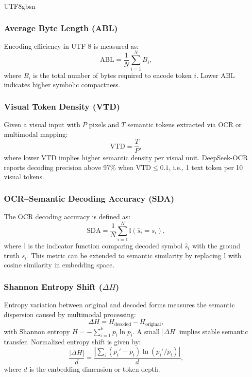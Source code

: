 \documentclass[conference]{IEEEtran}
\begin{document}
\begin{CJK*}{UTF8}{gbsn}
\subsubsection{Average Byte Length (ABL)}

Encoding efficiency in UTF-8 is measured as:
\begin{equation}
\text{ABL} = \frac{1}{N} \sum_{i=1}^{N} B_i,
\end{equation}
where $B_i$ is the total number of bytes required to encode token $i$.  
Lower $\text{ABL}$ indicates higher symbolic compactness.

\subsubsection{Visual Token Density (VTD)}

Given a visual input with $P$ pixels and $T$ semantic tokens extracted via OCR or multimodal mapping:
\begin{equation}
\text{VTD} = \frac{T}{P},
\end{equation}
where lower $\text{VTD}$ implies higher semantic density per visual unit.  
DeepSeek-OCR reports decoding precision above 97\% when $\text{VTD} \leq 0.1$, i.e., 1 text token per 10 visual tokens.

\subsubsection{OCR–Semantic Decoding Accuracy (SDA)}

The OCR decoding accuracy is defined as:
\begin{equation}
\text{SDA} = \frac{1}{N} \sum_{i=1}^{N} \mathbb{I}(\hat{s}_i = s_i),
\end{equation}
where $\mathbb{I}$ is the indicator function comparing decoded symbol $\hat{s}_i$ with the ground truth $s_i$.  
This metric can be extended to semantic similarity by replacing $\mathbb{I}$ with cosine similarity in embedding space.

\subsubsection{Shannon Entropy Shift ($\Delta H$)}

Entropy variation between original and decoded forms measures the semantic dispersion caused by multimodal processing:
\begin{equation}
\Delta H = H_{\text{decoded}} - H_{\text{original}},
\end{equation}
with Shannon entropy $H = - \sum_{i=1}^{k} p_i \ln p_i$.  
A small $|\Delta H|$ implies stable semantic transfer.  
Normalized entropy shift is given by:
\begin{equation}
\frac{|\Delta H|}{d} = \frac{|\sum_i (p_i' - p_i)\ln(p_i'/p_i)|}{d},
\end{equation}
where $d$ is the embedding dimension or token depth.


\end{CJK*}
\end{document}

